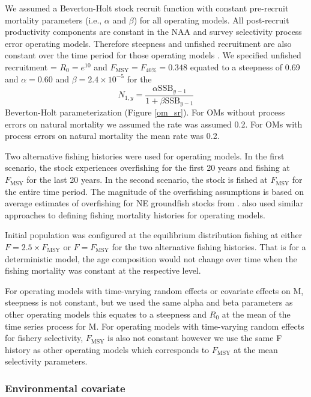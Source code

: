 \documentclass[
  12pt,
]{article}
\newcommand{\Fmsy}{\ensuremath{F_{\text{MSY}}}\xspace}
\begin{document}
We assumed a Beverton-Holt stock recruit function with constant pre-recruit mortality parameters (i.e., \(\alpha\) and \(\beta\)) for all operating models. All post-recruit productivity components are constant in the NAA and survey selectivity process error operating models. Therefore steepness and unfished recruitment are also constant over the time period for those operating models \citep{millerbrooks21}. We specified unfished recruitment = \(R_0 = e^{10}\) and \(\Fmsy = F_{40\%} = 0.348\) equated to a steepness of 0.69 and \(\alpha=0.60\) and \(\beta = 2.4 \times 10^{-5}\) for the
\[
N_{1,y} = \frac{\alpha \text{SSB}_{y-1}}{1 + \beta \text{SSB}_{y-1}} 
\]
Beverton-Holt parameterization (Figure \ref{om_sr}). For OMs without process errors on natural mortality we assumed the rate was assumed 0.2. For OMs with process errors on natural mortality the mean rate was 0.2.

Two alternative fishing histories were used for operating models. In the first scenario, the stock experiences overfishing for the first 20 years and fishing at \Fmsy for the last 20 years. In the second scenario, the stock is fished at \Fmsy for the entire time period. The magnitude of the overfishing assumptions is based on average estimates of overfishing for NE groundfish stocks from \citet{wiedenmannetal19}. \citet{legaultetal23} also used similar approaches to defining fishing mortality histories for operating models.

Initial population was configured at the equilibrium distribution fishing at either \(F = 2.5\times \Fmsy\) or \(F = \Fmsy\) for the two alternative fishing histories. That is for a deterministic model, the age composition would not change over time when the fishing mortality was constant at the respective level.

For operating models with time-varying random effects or covariate effects on M, steepness is not constant, but we used the same alpha and beta parameters as other operating models this equates to a steepness and \(R_0\) at the mean of the time series process for M. For operating models with time-varying random effects for fishery selectivity, \Fmsy is also not constant however we use the same F history as other operating models which corresponds to \Fmsy at the mean selectivity parameters.

\hypertarget{environmental-covariate}{%
\subsubsection*{Environmental covariate}\label{environmental-covariate}}
\end{document}
